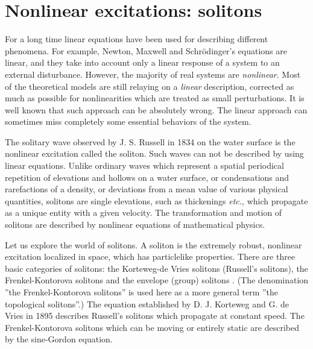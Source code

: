 \section{Nonlinear excitations: solitons}

For a long time linear equations have been used for describing different
phenomena. For example, Newton, Maxwell and Schr\"{o}dinger's
equations are linear, and they take into account only a linear response of
a system to an external disturbance. However, the majority of real systems 
are {\em nonlinear}. Most of the theoretical models are still relaying on a
{\em linear} description, corrected as much as possible for 
nonlinearities which are treated as small perturbations. It is well known 
that such approach can be absolutely wrong. The linear approach can 
sometimes miss completely some essential behaviors of the system. 

The solitary wave observed by J. S. Russell in 1834 on the water surface
is the nonlinear excitation called the soliton. Such waves can not be 
described by using linear equations. Unlike ordinary waves which represent 
a spatial periodical repetition of elevations and hollows on a water surface, 
or condensations and rarefactions of a density, or deviations from a mean 
value of various physical quantities, solitons are single elevations, such 
as thickenings {\em etc.}, which propagate as a unique entity with a given 
velocity. The transformation and motion of solitons are described by
nonlinear equations of mathematical physics.

Let us explore the world of solitons. 
A soliton is the extremely robust, nonlinear excitation 
localized in space, which has particlelike properties. There are three basic 
categories of solitons: the Korteweg-de Vries solitons (Russell's solitons), 
the Frenkel-Kontorova solitons and the envelope (group) solitons 
\cite{Filippov}. (The denomination ''the Frenkel-Kontorova solitons'' is used
here as a more general term ''the topological solitons''.)
The equation established 
by D. J. Korteweg and G. de Vries in 1895 describes Russell's solitons which
propagate at constant speed. The Frenkel-Kontorova solitons which can be 
moving or entirely static are described by the sine-Gordon equation. 

